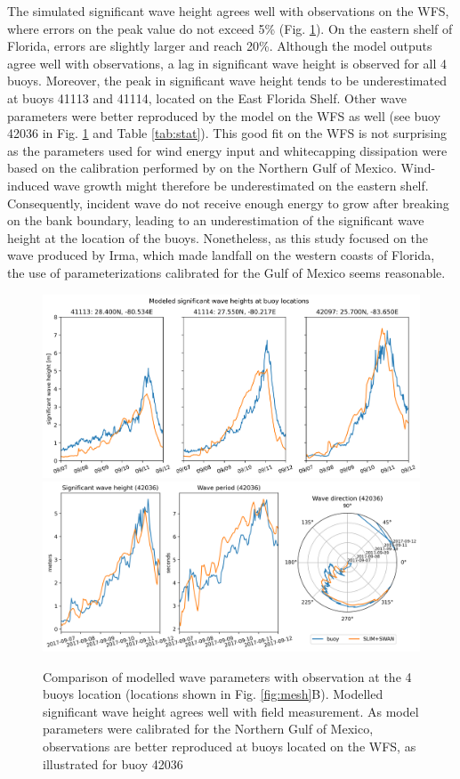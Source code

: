 \documentclass[preprint,12pt,authoryear]{elsarticle}
\begin{document}
The simulated significant wave height agrees well with observations on the WFS, where errors on the peak value do not exceed 5\% (Fig. \ref{fig:waves}). On the eastern shelf of Florida, errors are slightly larger and reach 20\%. Although the model outputs agree well with observations, a lag in significant wave height is observed for all 4 buoys. Moreover, the peak in significant wave height tends to be underestimated at buoys 41113 and 41114, located on the East Florida Shelf. Other wave parameters were better reproduced by the model on the WFS as well (see buoy 42036 in Fig. \ref{fig:waves} and Table \ref{tab:stat}). This good fit on the WFS is not surprising as the parameters used for wind energy input and whitecapping dissipation were based on the calibration performed by \cite{siadatmousavi2011evaluation} on the Northern Gulf of Mexico. Wind-induced wave growth might therefore be underestimated on the eastern shelf. Consequently, incident wave do not receive enough energy to grow after breaking on the bank boundary, leading to an underestimation of the significant wave height at the location of the buoys. Nonetheless, as this study focused on the wave produced by Irma, which made landfall on the western coasts of Florida, the use of parameterizations calibrated for the Gulf of Mexico seems reasonable.

\begin{figure}
    \centering
    \includegraphics[width=\textwidth]{fig/hsig_with_map_ww3.png}
    \includegraphics[width=\textwidth]{fig/waves_ww3_5km-00002.png}
    \caption{Comparison of modelled wave parameters with observation at the 4 buoys location (locations shown in Fig. \ref{fig:mesh}B). Modelled significant wave height agrees well with field measurement. As model parameters were calibrated for the Northern Gulf of Mexico, observations are better reproduced at buoys located on the WFS, as illustrated for buoy 42036}
    \label{fig:waves}
\end{figure}
\end{document}
